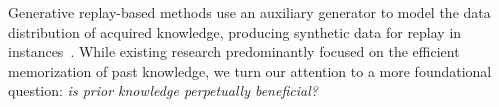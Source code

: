 Generative replay-based methods use an auxiliary generator to model the data distribution of acquired knowledge, producing synthetic data for replay in instances~\citep{DBLP:conf/icml/OdenaOS17, DBLP:conf/nips/WuHLWWR18}.
While existing research predominantly focused on the efficient memorization of past knowledge, we turn our attention to a more foundational question: \emph{is prior knowledge perpetually beneficial?}



